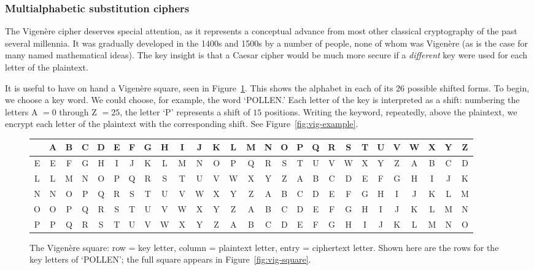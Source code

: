 \documentclass{article}
\theoremstyle{plain}
\theoremstyle{definition}
\theoremstyle{remark}
\numberwithin{theorem}{section}
\newcommand{\bespokedemo}[1]{\href{bespoke:#1}{\textsf{[\,interactive: #1\,]}}}
\newif\ifweb \webfalse
\DeclareRobustCommand{\webonly}[1]{\ifweb#1\fi}
\DeclareRobustCommand{\printonly}[1]{\ifweb\else#1\fi}
\begin{document}
\subsubsection{Multialphabetic substitution ciphers}

The Vigen\`ere cipher deserves special attention, as it represents a conceptual advance from most other classical cryptography of the past several millennia.  It was gradually developed in the 1400s and 1500s by a number of people, none of whom was Vigen\`ere (as is the case for many named mathematical ideas).  The key insight is that a Caesar cipher would be much more secure if a \emph{different} key were used for each letter of the plaintext.

It is useful to have on hand a Vigen\`ere square, seen in Figure~\ref{fig:vig-square-intro}.  This shows the alphabet in each of its 26 possible shifted forms.  To begin, we choose a key word.  We could choose, for example, the word `POLLEN.'  Each letter of the key is interpreted as a shift:  numbering the letters A $= 0$ through Z $= 25$, the letter `P' represents a shift of $15$ positions.  Writing the keyword, repeatedly, above the plaintext, we encrypt each letter of the plaintext with the corresponding shift.  See Figure~\ref{fig:vig-example}.

\begin{figure}
\begin{center}
\printonly{%
\small
\setlength{\tabcolsep}{2.2pt}
\begin{tabular}{c|cccccccccccccccccccccccccc}
  & A & B & C & D & E & F & G & H & I & J & K & L & M & N & O & P & Q & R & S & T & U & V & W & X & Y & Z \\
\hline
E & E & F & G & H & I & J & K & L & M & N & O & P & Q & R & S & T & U & V & W & X & Y & Z & A & B & C & D \\
L & L & M & N & O & P & Q & R & S & T & U & V & W & X & Y & Z & A & B & C & D & E & F & G & H & I & J & K \\
N & N & O & P & Q & R & S & T & U & V & W & X & Y & Z & A & B & C & D & E & F & G & H & I & J & K & L & M \\
O & O & P & Q & R & S & T & U & V & W & X & Y & Z & A & B & C & D & E & F & G & H & I & J & K & L & M & N \\
P & P & Q & R & S & T & U & V & W & X & Y & Z & A & B & C & D & E & F & G & H & I & J & K & L & M & N & O \\
\end{tabular}
}%
\webonly{\bespokedemo{vigenere-square}}
\end{center}
\caption{The Vigen\`ere square:  row = key letter, column = plaintext letter, entry = ciphertext letter.\printonly{  Shown here are the rows for the key letters of `POLLEN'; the full square appears in Figure~\ref{fig:vig-square}.}\webonly{  Hover an entry to read off a pairing.}}
\label{fig:vig-square-intro}
\end{figure}
\end{document}

